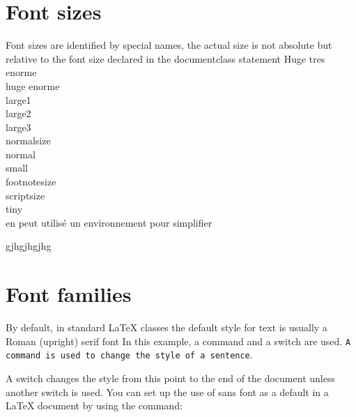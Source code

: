 \section{Font sizes} 
Font sizes are identified by special names, the actual size is not absolute but relative to the font size declared in the documentclass statement 
\Huge  Huge tres enorme \\
\huge  huge enorme \\
\normalsize
\LARGE   large1 \\
\normalsize
\Large   large2 \\
\normalsize
\large   large3 \\
\normalsize  normalsize \\
normal \\  %
\small{small}\\ 
\footnotesize{footnotesize}\\ 
\scriptsize{scriptsize}\\
\tiny{tiny}\\
en peut utilisé un environnement pour simplifier \\
\begin{tiny}
  gjhgjhgjhg \\
\end{tiny}
\normalsize












\section{Font families}
By default, in standard LaTeX classes the default style for text is usually a Roman (upright) serif font
In this example, a command and a switch are used. 
\texttt{A command is used to change the style 
of a sentence}.

\sffamily
A switch changes the style from this point to 
the end of the document unless another switch is used.
You can set up the use of sans font as a default in a LaTeX document by using the command:

% 

